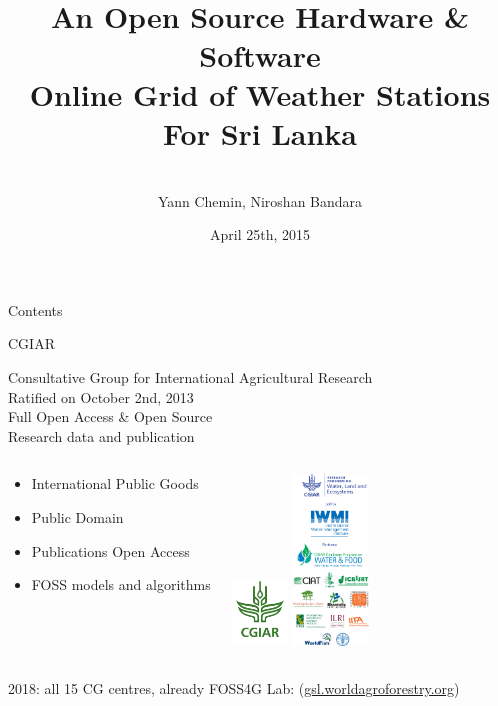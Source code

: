 \documentclass[xcolor=dvipsnames,beamer]{beamer} %
\title[UoMilan - OSHW]
{\ \\
\ \\
An Open Source Hardware \& Software\\
Online Grid of Weather Stations\\
For Sri Lanka}
\author[Chemin, Bandara]
{\vspace{30pt}\\
Yann Chemin, Niroshan Bandara}
\institute[IWMI - U of Moratuwa]
{International Water Management Institute\\
 \vspace{5pt}
Univ. of Moratuwa, Fac. of Archi., Town \& Country Planning Dept.
\begin{center}
\end{center}
}
\date{\tiny April 25th, 2015}
\begin{document}
\begin{frame}
 \maketitle
\end{frame}

\begin{frame}{Contents}
 \begin{multicols}{2}
  \setcounter{tocdepth}{2}  
  \tableofcontents
 \end{multicols} 
\end{frame}

\begin{frame}[fragile]{CGIAR}

Consultative Group for International Agricultural Research\\
Ratified on October 2nd, 2013\\
Full Open Access \& Open Source\\
Research data and publication

\begin{columns}
\begin{center}
\begin{itemize}
 \item International Public Goods
 \item Public Domain
 \item Publications Open Access
 \item FOSS models and algorithms
\end{itemize}
\end{center}

\begin{center}
  \includegraphics[width=1.5cm]{CGIAR_Green}
  \hspace{5mm}
  \includegraphics[width=2cm]{WLE_and_partners-vertical_logo_strip.png}
\end{center}
\end{columns}
\vspace{5mm} 2018: all 15 CG centres, already FOSS4G Lab:
(\href{http://gsl.worldagroforestry.org}{gsl.worldagroforestry.org})
\end{frame}
\end{document}
